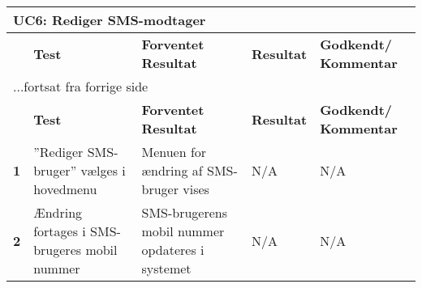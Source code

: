 
\begin{center}
\begin{longtable}{|p{}|p{}|p{}|p{}|p{}|} %
\hline
\multicolumn{5}{|l|}{\textbf{UC6: Rediger SMS-modtager}} \\ \hline
\multicolumn{1}{|c|}{} &
\textbf{Test} &
\textbf{Forventet \newline Resultat} &
\textbf{Resultat} &
\textbf{Godkendt/ \newline Kommentar} \\ \hline 
\endfirsthead

\multicolumn{5}{l}{...fortsat fra forrige side} \\ \hline 
\multicolumn{1}{|c|}{} &
\textbf{Test} &
\textbf{Forventet \newline Resultat} &
\textbf{Resultat} &
\textbf{Godkendt/ \newline Kommentar} \\ \hline 
\endhead


\textbf{1} &
''Rediger SMS-bruger'' vælges i hovedmenu &
Menuen for ændring af SMS-bruger vises &
N/A &
N/A \\\hline

\textbf{2} &
Ændring fortages i SMS-brugeres mobil nummer &
SMS-brugerens mobil nummer opdateres i systemet &
N/A &
N/A \\\hline


	\end{longtable}
	\label{ATUC6} 
\end{center}